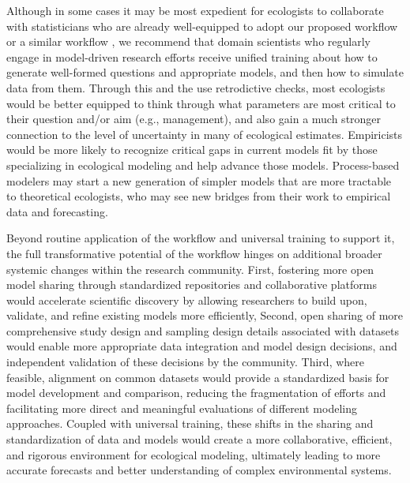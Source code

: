 \documentclass[11pt]{article}
\newcommand{\llabel}[1]{\hypertarget{lintarget:#1}{}\linelabel{lin:#1}}
\begin{document}
\llabel{collab}Although in some cases it may be most expedient for ecologists to collaborate with statisticians who are already well-equipped to adopt our proposed workflow or a similar workflow \citep{betanworkflow,Gelman2020, grinsztajn2021,vandeschoot2021}, we recommend that domain scientists who regularly engage in model-driven research efforts receive unified training about how to generate well-formed questions and appropriate models, and then how to simulate data from them.
Through this and the use retrodictive checks, most ecologists would be better equipped to think through what parameters are most critical to their question and/or aim (e.g., management), and also gain a much stronger connection to the level of uncertainty in many of ecological estimates. Empiricists would be more likely to recognize critical gaps in current models fit by those specializing in ecological modeling and help advance those models. Process-based modelers may start a new generation of simpler models that are more tractable to theoretical ecologists, who may see new bridges from their work to empirical data and forecasting.

Beyond routine application of the workflow and universal training to support it, the full transformative potential of the workflow hinges on additional broader systemic changes within the research community. First, fostering more open model sharing through standardized repositories and collaborative platforms would accelerate scientific discovery by allowing researchers to build upon, validate, and refine existing models more efficiently, Second, open sharing of more comprehensive study design and sampling design details associated with datasets would enable more appropriate data integration and model design decisions, and independent validation of these decisions by the community. Third, where feasible, alignment on common datasets would provide a standardized basis for model development and comparison, reducing the fragmentation of efforts and facilitating more direct and meaningful evaluations of different modeling approaches. Coupled with universal training, these shifts in the sharing and standardization of data and models would create a more collaborative, efficient, and rigorous environment for ecological modeling, ultimately leading to more accurate forecasts and better understanding of complex environmental systems.
\end{document}
